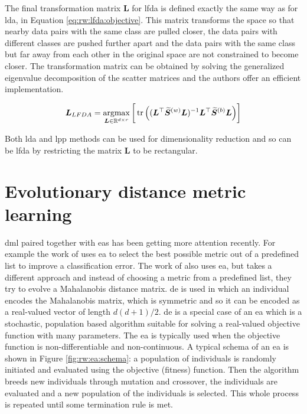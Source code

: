 \documentclass[12pt,a4paper]{report}
\begin{document}
The final transformation matrix $\bm{L}$ for \ac{lfda} is defined exactly the same way as for \ac{lda}, in Equation \ref{eq:rw:lfda:objective}. This matrix transforms the space so that nearby data pairs with the same class are pulled closer, the data pairs with different classes are pushed further apart and the data pairs with the same class but far away from each other in the original space are not constrained to become closer. The transformation matrix can be obtained by solving the generalized eigenvalue decomposition of the scatter matrices and the authors offer an efficient implementation.

\begin{equation}
\bm{L}_{LFDA} = \operatorname*{argmax}_{\bm{L} \in \mathbb{R}^{d \times r}} \bigg[\operatorname*{tr}\Big( ( \bm{L}^\top\widetilde{\bm{S}}^{(w)}\bm{L} )^{-1} \bm{L}^\top\widetilde{\bm{S}}^{(b)}\bm{L} \Big)\bigg] \label{eq:rw:lfda:objective}
\end{equation}

Both \ac{lda} and \ac{lpp} methods can be used for dimensionality reduction and so can be \ac{lfda} by restricting the matrix $\bm{L}$ to be rectangular.

\section{Evolutionary distance metric learning} \label{chap:rw:fukui}


\Acl{dml} paired together with \acp{ea} has been getting more attention recently. For example the work of \citep{koloseni2012optimized} uses \ac{ea} to select the best possible metric out of a predefined list to improve a classification error. The work of \citep{fukui2013evolutionary} also uses \ac{ea}, but takes a different approach and instead of choosing a metric from a predefined list, they try to evolve a Mahalanobis distance matrix. \Acl{de} is used in which an individual encodes the Mahalanobis matrix, which is symmetric and so it can be encoded as a real-valued vector of length $d(d+1)/2$. \Acl{de} is a special case of an \ac{ea} which is a stochastic, population based algorithm suitable for solving a real-valued objective function with many parameters. The \ac{ea} is typically used when the objective function is non-differentiable and non-continuous. A typical schema of an \ac{ea} is shown in Figure \ref{fig:rw:ea:schema}: a population of individuals is randomly initiated and evaluated using the objective (fitness) function. Then the algorithm breeds new individuals through mutation and crossover, the individuals are evaluated and a new population of the individuals is selected. This whole process is repeated until some termination rule is met.
\end{document}
